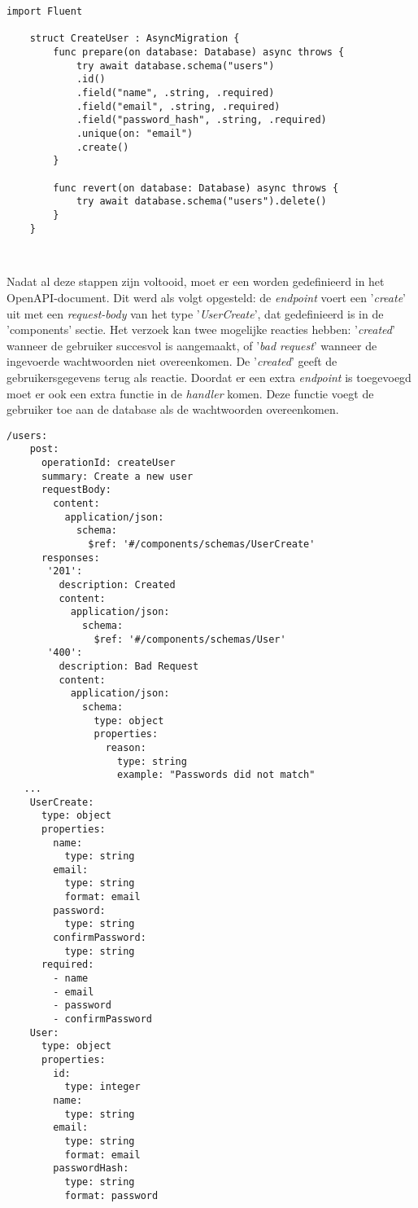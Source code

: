 \begin{lstlisting}[caption=Migration file]
    import Fluent
    
    struct CreateUser : AsyncMigration {
        func prepare(on database: Database) async throws {
            try await database.schema("users")
            .id()
            .field("name", .string, .required)
            .field("email", .string, .required)
            .field("password_hash", .string, .required)
            .unique(on: "email")
            .create()
        }
        
        func revert(on database: Database) async throws {
            try await database.schema("users").delete()
        }
    }
    
    
\end{lstlisting}

Nadat al deze stappen zijn voltooid, moet er een worden gedefinieerd in het OpenAPI-document. Dit werd als volgt opgesteld: de \textit{endpoint} voert een '\textit{create}' uit met een \textit{request-body} van het type '\textit{UserCreate}', dat gedefinieerd is in de 'components' sectie. Het verzoek kan twee mogelijke reacties hebben: '\textit{created}' wanneer de gebruiker succesvol is aangemaakt, of '\textit{bad request}' wanneer de ingevoerde wachtwoorden niet overeenkomen. De '\textit{created}' geeft de gebruikersgegevens terug als reactie. Doordat er een extra \textit{endpoint} is toegevoegd moet er ook een extra functie in de \textit{handler} komen. 
Deze functie voegt de gebruiker toe aan de database als de wachtwoorden overeenkomen. 

\begin{lstlisting}[caption=openapi.yaml file]
  /users:
    post:
      operationId: createUser
      summary: Create a new user
      requestBody:
        content:
          application/json:
            schema:
              $ref: '#/components/schemas/UserCreate'
      responses:
       '201':
         description: Created
         content:
           application/json:
             schema:
               $ref: '#/components/schemas/User'
       '400':
         description: Bad Request
         content:
           application/json:
             schema:
               type: object
               properties:
                 reason:
                   type: string
                   example: "Passwords did not match"
   ...
    UserCreate:
      type: object
      properties:
        name:
          type: string
        email:
          type: string
          format: email
        password:
          type: string
        confirmPassword:
          type: string
      required:
        - name
        - email
        - password
        - confirmPassword
    User:
      type: object
      properties:
        id:
          type: integer
        name:
          type: string
        email:
          type: string
          format: email
        passwordHash:
          type: string
          format: password
 
\end{lstlisting}


